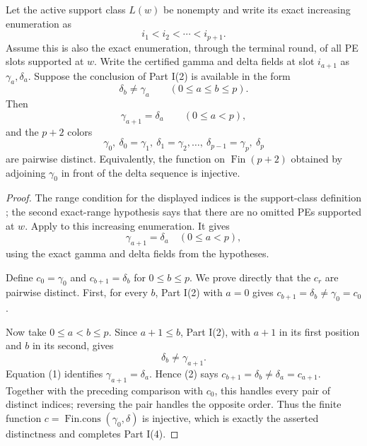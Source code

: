 \begin{lemma}
Let the active support class \(L(w)\) be nonempty and write its exact
increasing enumeration as
\[
             i_1<i_2<\cdots<i_{p+1}.
\]
Assume this is also the exact enumeration, through the terminal round, of
all PE slots supported at \(w\).  Write the certified gamma and delta fields
at slot \(i_{a+1}\) as \(\gamma_a,\delta_a\).  Suppose the conclusion of
Part I(2) is available in the form
\[
                 \delta_b\ne\gamma_a\qquad(0\leq a\leq b\leq p).
\]
Then
\[
 \gamma_{a+1}=\delta_a\qquad(0\leq a<p),
\]
and the \(p+2\) colors
\[
 \gamma_0,\ \delta_0=\gamma_1,\ \delta_1=\gamma_2,
       \ldots,\ \delta_{p-1}=\gamma_p,\ \delta_p
\]
are pairwise distinct.  Equivalently, the function on
\(\operatorname{Fin}(p+2)\) obtained by adjoining \(\gamma_0\) in front
of the delta sequence is injective.
\end{lemma}
\begin{proof}
The range condition for the displayed indices is the support-class
definition ; the second exact-range
hypothesis says that there are no omitted PEs supported at \(w\).  Apply
 to this increasing enumeration.  It gives
\[
                    \gamma_{a+1}=\delta_a
                    \quad(0\leq a<p),                         \tag{1}
\]
using the exact gamma and delta fields from the hypotheses.

Define \(c_0=\gamma_0\) and \(c_{b+1}=\delta_b\) for
\(0\leq b\leq p\).  We prove directly that the \(c_r\) are pairwise
distinct.  First, for every \(b\), Part I(2) with \(a=0\) gives
\(c_{b+1}=\delta_b\ne\gamma_0=c_0\).

Now take \(0\leq a<b\leq p\).  Since \(a+1\leq b\), Part I(2), with
\(a+1\) in its first position and \(b\) in its second, gives
\[
                         \delta_b\ne\gamma_{a+1}.              \tag{2}
\]
Equation (1) identifies \(\gamma_{a+1}=\delta_a\).  Hence (2) says
\(c_{b+1}=\delta_b\ne\delta_a=c_{a+1}\).  Together with the preceding
comparison with \(c_0\), this handles every pair of distinct indices;
reversing the pair handles the opposite order.  Thus the finite function
\(c=\operatorname{Fin.cons}(\gamma_0,\delta)\) is injective, which is
exactly the asserted distinctness and completes Part I(4).
\end{proof}

